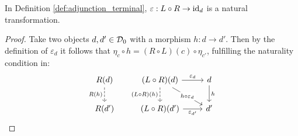 \begin{theorem}
  In Definition \ref{def:adjunction_terminal}, $\varepsilon: L\circ R \to \mathrm{id}_d$
  is a natural transformation.

  \begin{proof}
    Take two objects $d,d'\in \mathcal{D}_0$ with a morphism $h:d\to d'$. Then by the
    definition of $\varepsilon_{d}$ it follows that $\eta_c\circ h = (R\circ
    L)(c)\circ \eta_{c'}$, fulfilling the naturality condition in:
    \[\begin{tikzcd}[ampersand replacement=\&]
      {R(d)} \& {(L\circ R)(d)} \& d \\
      {R(d')} \& {(L\circ R)(d')} \& {d'}
      \arrow["h", from=1-3, to=2-3]
      \arrow["{R(h)}"', dashed, from=1-1, to=2-1]
      \arrow["{\epsilon_d}", from=1-2, to=1-3]
      \arrow["{\epsilon_{d'}}"', from=2-2, to=2-3]
      \arrow["{h\circ\epsilon_d}"{description}, from=1-2, to=2-3]
      \arrow["{(L\circ R)(h)}"', dashed, from=1-2, to=2-2]
    \end{tikzcd}\]
  \end{proof}
\end{theorem}


